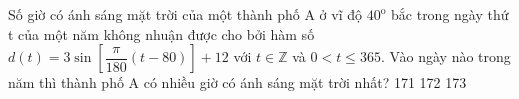 \begin{ex}
	Số giờ có ánh sáng mặt trời của một thành phố A ở vĩ độ ${{40}^{\text{o}}}$ bắc trong ngày thứ t của một năm không nhuận được cho bởi hàm số $d(t)=3\sin \left[\dfrac{\pi }{180}(t-80)\right]+12$ với $t\in \mathbb{Z}$ và $0<t\le 365$. Vào ngày nào trong năm thì thành phố A có nhiều giờ có ánh sáng mặt trời nhất?
	\choice
	{}
	{171}
	{172}
	{173}
\end{ex}


